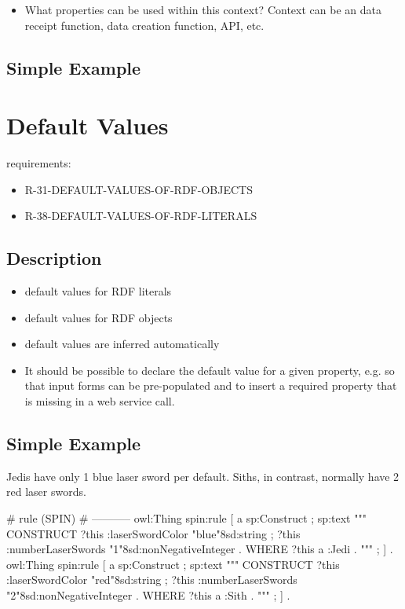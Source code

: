 \documentclass{llncs}
\begin{document}
\begin{itemize}
	\item What properties can be used within this context? Context can be an data receipt function, data creation function, API, etc.
\end{itemize}

\subsection{Simple Example}



\section{Default Values}

requirements:

\begin{itemize}
	\item R-31-DEFAULT-VALUES-OF-RDF-OBJECTS
  \item R-38-DEFAULT-VALUES-OF-RDF-LITERALS
\end{itemize}

\subsection{Description}

\begin{itemize}
	\item default values for RDF literals
	\item default values for RDF objects
	\item default values are inferred automatically
	\item It should be possible to declare the default value for a given property, e.g. so that input forms can be pre-populated and to insert a required property that is missing in a web service call. 
\end{itemize}

\subsection{Simple Example}

Jedis have only 1 blue laser sword per default.
Siths, in contrast, normally have 2 red laser swords.

\begin{ex}
# rule (SPIN)
# -----------
owl:Thing
    spin:rule [
        a sp:Construct ;
            sp:text """
                CONSTRUCT {            
                    ?this :laserSwordColor "blue"^^xsd:string ;
                    ?this :numberLaserSwords "1"^^xsd:nonNegativeInteger . 
                }
                WHERE {             
                    ?this a :Jedi .            
                } """ ; ] .
owl:Thing
    spin:rule [
        a sp:Construct ;
            sp:text """
                CONSTRUCT {
                    ?this :laserSwordColor "red"^^xsd:string ;
                    ?this :numberLaserSwords "2"^^xsd:nonNegativeInteger . 
                }
                WHERE {             
                    ?this a :Sith .            
                } """ ; ] .
\end{ex}
\end{document}
